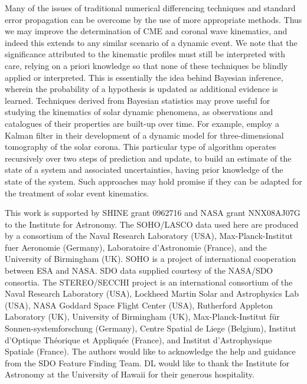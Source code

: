 \documentclass[structabstract]{aa}
\begin{document}
Many of the issues of traditional numerical differencing techniques and standard error propagation can be overcome by the use of more appropriate methods. Thus we may improve the determination of CME and coronal wave kinematics, and indeed this extends to any similar scenario of a dynamic event. We note that the significance attributed to the kinematic profiles must still be interpreted with care, relying on a priori knowledge so that none of these techniques be blindly applied or interpreted. This is essentially the idea behind Bayesian inference, wherein the probability of a hypothesis is updated as additional evidence is learned. Techniques derived from Bayesian statistics may prove useful for studying the kinematics of solar dynamic phenomena, as observations and catalogues of their properties are built-up over time. For example, \citet{2010SoPh..262..495B} employ a Kalman filter in their development of a dynamic model for three-dimensional tomography of the solar corona. This particular type of algorithm operates recursively over two steps of prediction and update, to build an estimate of the state of a system and associated uncertainties, having prior knowledge of the state of the system. Such approaches may hold promise if they can be adapted for the treatment of solar event kinematics.


\begin{acknowledgements}
This work is supported by SHINE grant 0962716 and NASA grant NNX08AJ07G to the Institute for Astronomy. The SOHO/LASCO data used here are produced by a consortium of the Naval Research Laboratory (USA), Max-Planck-Institut fuer Aeronomie (Germany), Laboratoire d'Astronomie (France), and the University of Birmingham (UK). SOHO is a project of international cooperation between ESA and NASA. SDO data supplied courtesy of the NASA/SDO consortia. The STEREO/SECCHI project is an international consortium of the Naval Research Laboratory (USA), Lockheed Martin Solar and Astrophysics Lab (USA), NASA Goddard Space Flight Center (USA), Rutherford Appleton Laboratory (UK), University of Birmingham (UK), Max-Planck-Institut f\"{u}r Sonnen-systemforschung (Germany), Centre Spatial de Liege (Belgium), Institut d'Optique Th\'{e}orique et Appliqu\'{e}e (France), and Institut d'Astrophysique Spatiale (France). The authors would like to acknowledge the help and guidance from the SDO Feature Finding Team. DL would like to thank the Institute for Astronomy at the University of Hawaii for their generous hospitality. 
\end{acknowledgements}




  
\end{document}
